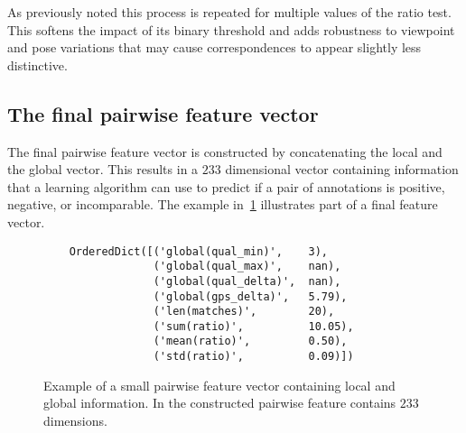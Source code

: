 As previously noted this process is repeated for multiple values of the ratio test.
This softens the impact of its binary threshold and adds robustness to viewpoint and pose variations that may
  cause correspondences to appear slightly less distinctive.

\FloatBarrier{}
\subsection{The final pairwise feature vector}

The final pairwise feature vector is constructed by concatenating the local and the global vector.
This results in a $233$ dimensional vector containing information that a learning algorithm can use to predict if
  a pair of annotations is positive, negative, or incomparable.
The example in~\cref{fig:PairFeatVec} illustrates part of a final feature vector.






\begin{figure}
\begin{verbatim}
    OrderedDict([('global(qual_min)',    3),
                 ('global(qual_max)',    nan),
                 ('global(qual_delta)',  nan),
                 ('global(gps_delta)',   5.79),
                 ('len(matches)',        20),
                 ('sum(ratio)',          10.05),
                 ('mean(ratio)',         0.50),
                 ('std(ratio)',          0.09)])
\end{verbatim}
\caption[A pairwise feature vector]{ %
Example of a small pairwise feature vector containing local and global information.
In the constructed pairwise feature contains $233$ dimensions.
}
\label{fig:PairFeatVec}
\end{figure}


